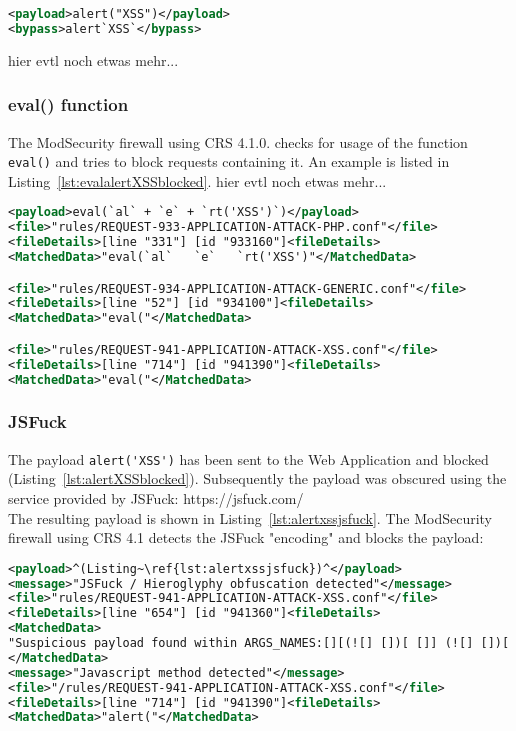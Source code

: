 \begin{lstlisting}[style=ruleStyle, language=XML, caption=alert`XSS` bypass, label=lst:alertXSSbypass]
<payload>alert("XSS")</payload>
<bypass>alert`XSS`</bypass>
\end{lstlisting}

{\color{red} hier evtl noch etwas mehr...}

\subsubsection{eval() function}
The ModSecurity firewall using CRS 4.1.0. checks for usage of the function \verb|eval()| and tries to block requests containing it. An example is listed in Listing~\ref{lst:evalalertXSSblocked}.
{\color{red} hier evtl noch etwas mehr...}

\begin{lstlisting}[style=ruleStyle, language=XML, caption=eval(`al` + `e` + `rt('XSS')`) blocking example, label={lst:evalalertXSSblocked}]
<payload>eval(`al` + `e` + `rt('XSS')`)</payload>
<file>"rules/REQUEST-933-APPLICATION-ATTACK-PHP.conf"</file>
<fileDetails>[line "331"] [id "933160"]<fileDetails>
<MatchedData>"eval(`al`   `e`   `rt('XSS')"</MatchedData>

<file>"rules/REQUEST-934-APPLICATION-ATTACK-GENERIC.conf"</file>
<fileDetails>[line "52"] [id "934100"]<fileDetails>
<MatchedData>"eval("</MatchedData>

<file>"rules/REQUEST-941-APPLICATION-ATTACK-XSS.conf"</file>
<fileDetails>[line "714"] [id "941390"]<fileDetails>
<MatchedData>"eval("</MatchedData>
\end{lstlisting}

\subsubsection{JSFuck}
The payload \verb|alert('XSS')| has been sent to the Web Application and blocked (Listing~\ref{lst:alertXSSblocked}). Subsequently the payload was obscured using the service provided by JSFuck: https://jsfuck.com/ \\
The resulting payload is shown in Listing~\ref{lst:alertxssjsfuck}. The ModSecurity firewall using CRS 4.1 detects the JSFuck "encoding" and blocks the payload:

\begin{lstlisting}[style=ruleStyle, language=XML, caption=alert('XSS') in JSFuck blocked, label={lst:alertxssjsfuckblocked}]
<payload>^(Listing~\ref{lst:alertxssjsfuck})^</payload>
<message>"JSFuck / Hieroglyphy obfuscation detected"</message>
<file>"rules/REQUEST-941-APPLICATION-ATTACK-XSS.conf"</file>
<fileDetails>[line "654"] [id "941360"]<fileDetails>
<MatchedData>
"Suspicious payload found within ARGS_NAMES:[][(![] [])[ []] (![] [])[! [] ! []] (![] [])[ ! []] (!![] [])[ []]][([][(![] [])[ []] (![] [])[! [] ! []] (![] [])[ ! []] (!![] [])[ []]] [])[ (11337 characters omitted)"
</MatchedData>
<message>"Javascript method detected"</message>
<file>"/rules/REQUEST-941-APPLICATION-ATTACK-XSS.conf"</file>
<fileDetails>[line "714"] [id "941390"]<fileDetails>
<MatchedData>"alert("</MatchedData>
\end{lstlisting}


